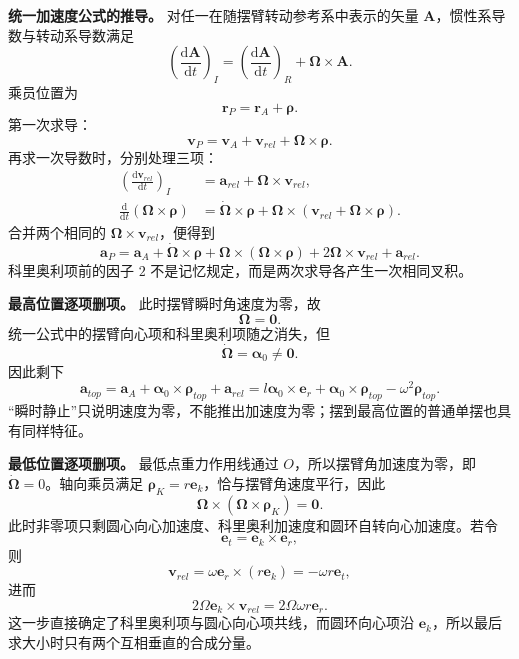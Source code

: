 \documentclass[12pt,a4paper,UTF8]{ctexart}
\begin{document}
\textbf{统一加速度公式的推导。} 对任一在随摆臂转动参考系中表示的矢量
\(\boldsymbol A\)，惯性系导数与转动系导数满足 \[
\left(\frac{\mathrm d\boldsymbol A}{\mathrm dt}\right)_{\!I}
=
\left(\frac{\mathrm d\boldsymbol A}{\mathrm dt}\right)_{\!R}
+\boldsymbol\Omega\times\boldsymbol A.
\] 乘员位置为 \[
\boldsymbol r_P=\boldsymbol r_A+\boldsymbol\rho.
\] 第一次求导： \[
\boldsymbol v_P
=\boldsymbol v_A+\boldsymbol v_{rel}
+\boldsymbol\Omega\times\boldsymbol\rho.
\] 再求一次导数时，分别处理三项： \[
\begin{aligned}
\left(\frac{\mathrm d\boldsymbol v_{rel}}{\mathrm dt}\right)_{\!I}
&=\boldsymbol a_{rel}
+\boldsymbol\Omega\times\boldsymbol v_{rel},\\
\frac{\mathrm d}{\mathrm dt}
(\boldsymbol\Omega\times\boldsymbol\rho)
&=\dot{\boldsymbol\Omega}\times\boldsymbol\rho
+\boldsymbol\Omega\times
\left(\boldsymbol v_{rel}
+\boldsymbol\Omega\times\boldsymbol\rho\right).
\end{aligned}
\] 合并两个相同的 \(\boldsymbol\Omega\times\boldsymbol v_{rel}\)，便得到
\[
\boldsymbol a_P
=\boldsymbol a_A
+\dot{\boldsymbol\Omega}\times\boldsymbol\rho
+\boldsymbol\Omega\times
(\boldsymbol\Omega\times\boldsymbol\rho)
+2\boldsymbol\Omega\times\boldsymbol v_{rel}
+\boldsymbol a_{rel}.
\] 科里奥利项前的因子 \(2\)
不是记忆规定，而是两次求导各产生一次相同叉积。

\textbf{最高位置逐项删项。} 此时摆臂瞬时角速度为零，故 \[
\boldsymbol\Omega=\boldsymbol0.
\] 统一公式中的摆臂向心项和科里奥利项随之消失，但 \[
\dot{\boldsymbol\Omega}=\boldsymbol\alpha_0\ne\boldsymbol0.
\] 因此剩下 \[
\boldsymbol a_{top}
=\boldsymbol a_A+\boldsymbol\alpha_0\times\boldsymbol\rho_{top}+\boldsymbol a_{rel}
=l\boldsymbol\alpha_0\times\boldsymbol e_r
+\boldsymbol\alpha_0\times\boldsymbol\rho_{top}
-\omega^2\boldsymbol\rho_{top}.
\]
``瞬时静止''只说明速度为零，不能推出加速度为零；摆到最高位置的普通单摆也具有同样特征。

\textbf{最低位置逐项删项。} 最低点重力作用线通过
\(O\)，所以摆臂角加速度为零，即
\(\dot{\boldsymbol\Omega}=0\)。轴向乘员满足
\(\boldsymbol\rho_K=r\boldsymbol e_k\)，恰与摆臂角速度平行，因此 \[
\boldsymbol\Omega\times
(\boldsymbol\Omega\times\boldsymbol\rho_K)=\boldsymbol0.
\]
此时非零项只剩圆心向心加速度、科里奥利加速度和圆环自转向心加速度。若令
\[
\boldsymbol e_t=\boldsymbol e_k\times\boldsymbol e_r,
\] 则 \[
\boldsymbol v_{rel}
=\omega\boldsymbol e_r\times
(r\boldsymbol e_k)
=-\omega r\boldsymbol e_t,
\] 进而 \[
2\Omega\boldsymbol e_k\times\boldsymbol v_{rel}
=2\Omega\omega r\boldsymbol e_r.
\] 这一步直接确定了科里奥利项与圆心向心项共线，而圆环向心项沿
\(\boldsymbol e_k\)，所以最后求大小时只有两个互相垂直的合成分量。
\end{document}
